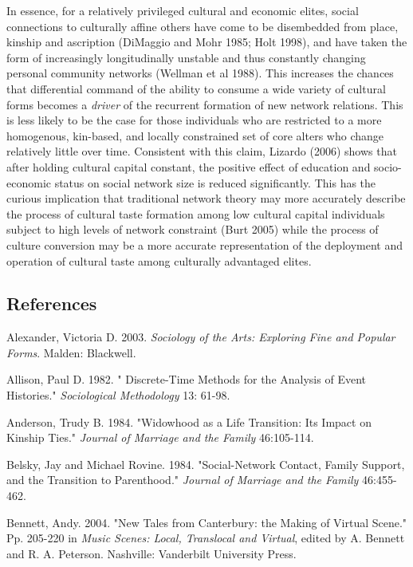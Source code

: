 \documentclass[
]{article}
\begin{document}
In essence, for a relatively privileged cultural and economic elites, social connections to culturally affine others have come to be disembedded from place, kinship and ascription (DiMaggio and Mohr 1985; Holt 1998), and have taken the form of increasingly longitudinally unstable and thus constantly changing personal community networks (Wellman et al 1988). This increases the chances that differential command of the ability to consume a wide variety of cultural forms becomes a \emph{driver} of the recurrent formation of new network relations. This is less likely to be the case for those individuals who are restricted to a more homogenous, kin-based, and locally constrained set of core alters who change relatively little over time. Consistent with this claim, Lizardo (2006) shows that after holding cultural capital constant, the positive effect of education and socio-economic status on social network size is reduced significantly. This has the curious implication that traditional network theory may more accurately describe the process of cultural taste formation among low cultural capital individuals subject to high levels of network constraint (Burt 2005) while the process of culture conversion may be a more accurate representation of the deployment and operation of cultural taste among culturally advantaged elites.

\subsection{References}\label{references}

Alexander, Victoria D. 2003. \emph{Sociology of the Arts: Exploring Fine and Popular Forms}. Malden: Blackwell.

Allison, Paul D. 1982. " Discrete-Time Methods for the Analysis of Event Histories." \emph{Sociological Methodology} 13: 61-98.

Anderson, Trudy B. 1984. "Widowhood as a Life Transition: Its Impact on Kinship Ties." \emph{Journal of Marriage and the Family} 46:105-114.

Belsky, Jay and Michael Rovine. 1984. "Social-Network Contact, Family Support, and the Transition to Parenthood." \emph{Journal of Marriage and the Family} 46:455-462.

Bennett, Andy. 2004. "New Tales from Canterbury: the Making of Virtual Scene." Pp. 205-220 in \emph{Music Scenes: Local, Translocal and Virtual}, edited by A. Bennett and R. A. Peterson. Nashville: Vanderbilt University Press.
\end{document}
